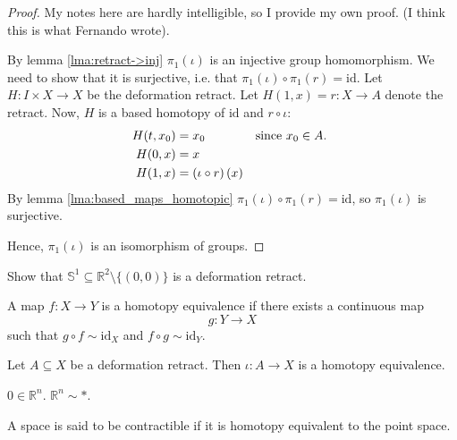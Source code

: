 \begin{proof}
  My notes here are hardly intelligible, so I provide
  my own proof. (I think this is what Fernando wrote).

  By lemma \ref{lma:retract->inj}
  \( \pi_1(\iota) \) is an injective group homomorphism.
  We need to show that it is surjective, i.e. that
  \( \pi_1(\iota) \circ \pi_1(r) = \text{id}  \).
  Let \( H: I \times X \to X \) be the
  deformation retract.
  Let \( H(1, x) = r: X \to A \) denote the retract.
  Now, \( H \) is a based homotopy of \( \text{id} \) and
  \( r \circ \iota  \):
  \begin{align*}
    H(t, x_0) &= x_0 & \text{since \( x_0 \in A \). } \\
    H(0, x) &= x \\
    H(1, x) &= \left(\iota \circ r\right)(x)
  \end{align*}
  By lemma \ref{lma:based_maps_homotopic}
  \( \pi_1(\iota) \circ \pi_1(r) = \text{id} \),
  so \( \pi_1(\iota) \) is surjective.

  Hence, \( \pi_1(\iota) \) is an isomorphism
  of groups.
\end{proof}

\begin{exercise}
    Show that \( \mathbb{S}^1 \subseteq \mathbb{R}^2 \setminus \{ (0, 0) \}  \)
    is a deformation retract.
\end{exercise}

\begin{definition}
    A map \( f: X \to Y \) is a homotopy equivalence
    if there exists a continuous map
    \[
      g: Y \to X
    \]
    such that \( g \circ f \sim \text{id}_X \)
    and \( f \circ g \sim \text{id}_Y \).
\end{definition}

\begin{example}
  Let \( A \subseteq X \) be a deformation retract.
  Then \( \iota: A \to X \) is a homotopy equivalence.
\end{example}

\begin{example}
    \( 0 \in \mathbb{R}^n \). \( \mathbb{R}^n \sim * \).
\end{example}

\begin{definition}
   A space is said to be contractible
   if it is homotopy equivalent to
   the point space.
\end{definition}

